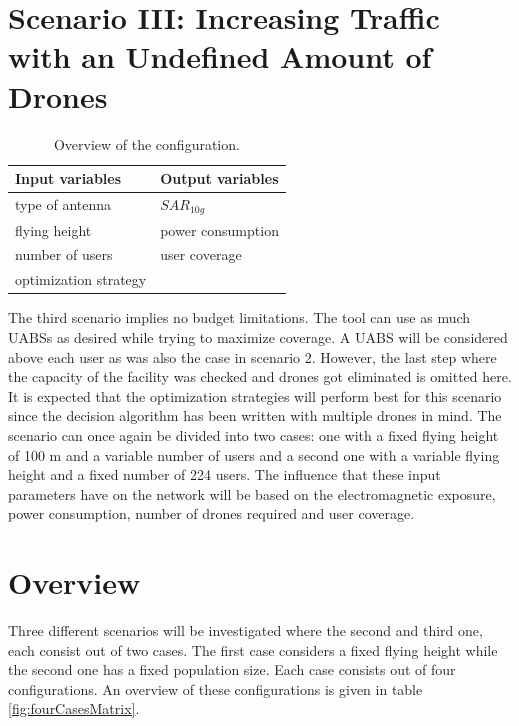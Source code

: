 \section{Scenario III: Increasing Traffic with an Undefined Amount of Drones}
\begin{table}[!htb]
      \centering
            \begin{tabular}{|l|l|}
            \hline
            \textbf{Input variables  }              & \textbf{Output variables}          \\   \hline 
            type of antenna                & $SAR_{10g}$               \\ 
            flying height                   & power consumption             \\ 
            number of users                & user coverage            \\ 
            optimization strategy           & \\
            \hline
            \end{tabular}
        \caption{Overview of the configuration.}
        \label{table:confOverviewScenario2}
\end{table}

The third scenario implies no budget limitations. The tool can use as much \gls{UABS}s as desired while trying to maximize coverage. 
A \gls{UABS} will be considered above each user as was also the case in scenario 2. However, the last step where the capacity of the facility
was checked and drones got eliminated is omitted here. It is expected that the optimization strategies will perform best for this scenario since the decision algorithm has been written
 with multiple drones in mind.
The scenario can once again be divided into two cases: one with a fixed flying height of 100 m and a variable number of users and a second one with 
a variable flying height and a fixed number of 224 users.
The influence that these input parameters have on the network will be based on the electromagnetic exposure, power consumption, number of drones required and user coverage.

\section{Overview}
Three different scenarios will be investigated where the second and third one, each consist out of two cases. The first case considers a fixed flying height while 
the second one has a fixed population size. Each case consists out of four configurations. An overview of these configurations is given in table \ref{fig:fourCasesMatrix}.

